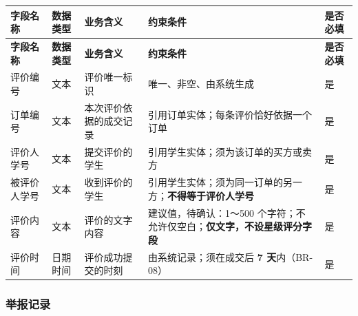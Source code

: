 \documentclass[12pt,a4paper]{ctexart}
\begin{document}
{\footnotesize
\begin{longtable}{|p{2.12cm}|p{1.58cm}|p{3.27cm}|p{7.45cm}|p{1.58cm}|}
\hline
\textbf{字段名称} & \textbf{数据类型} & \textbf{业务含义} & \textbf{约束条件} & \textbf{是否必填} \\
\hline
\endfirsthead
\hline
\textbf{字段名称} & \textbf{数据类型} & \textbf{业务含义} & \textbf{约束条件} & \textbf{是否必填} \\
\hline
\endhead
\hline
\endfoot
评价编号 & 文本 & 评价唯一标识 & 唯一、非空、由系统生成 & 是 \\
\hline
订单编号 & 文本 & 本次评价依据的成交记录 & 引用订单实体；每条评价恰好依据一个订单 & 是 \\
\hline
评价人学号 & 文本 & 提交评价的学生 & 引用学生实体；须为该订单的买方或卖方 & 是 \\
\hline
被评价人学号 & 文本 & 收到评价的学生 & 引用学生实体；须为同一订单的另一方；\textbf{不得等于评价人学号} & 是 \\
\hline
评价内容 & 文本 & 评价的文字内容 & 建议值，待确认：1～500 个字符；不允许仅空白；\textbf{仅文字，不设星级评分字段} & 是 \\
\hline
评价时间 & 日期时间 & 评价成功提交的时刻 & 由系统记录；须在成交后 \textbf{7 天}内（BR-08） & 是 \\
\hline
\end{longtable}
}


\subsubsection*{举报记录}
\end{document}
